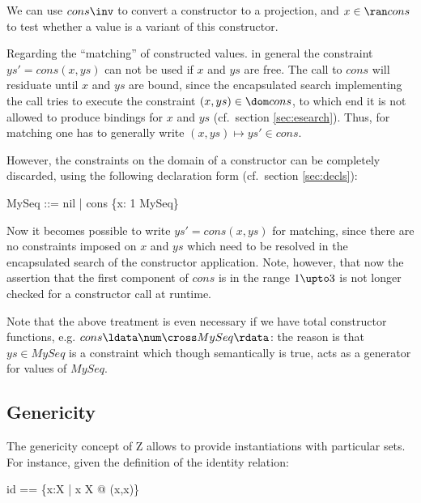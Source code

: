 \documentclass{article}
\begin{document}
We can use $cons\inv$ to convert a constructor to a projection,
and $x \in \ran cons$ to test whether a value is a variant of
this constructor.

Regarding the ``matching'' of constructed values.  in general the
constraint $ys' = cons(x,ys)$ can not be used if $x$ and $ys$ are
free.  The call to $cons$ will residuate until $x$ and $ys$ are bound,
since the encapsulated search implementing the call tries to execute
the constraint $(x,ys) \in \dom cons$, to which end it is not allowed
to produce bindings for $x$ and $ys$ (cf.~section \ref{sec:esearch}).
Thus, for matching one has to generally write $(x,ys) \mapsto ys' \in
cons$.

However, the constraints on the domain of a constructor can be
completely discarded, using the following declaration form
(cf.~section \ref{sec:decls}):

\begin{zedgroup}
\begin{zdirectives}
\end{zdirectives}
\begin{zed}
  MySeq ::= nil | cons \ldata \{x: 1  \cross MySeq\} \rdata
\end{zed}
\end{zedgroup}

Now it becomes possible to write $ys' = cons(x,ys)$ for matching,
since there are no constraints imposed on $x$ and $ys$ which need
to be resolved in the encapsulated search of the constructor
application. Note, however, that now the assertion that
the first component of $cons$ is in the range $1 \upto 3$ is
not longer checked for a constructor call at runtime. 

Note that the above treatment is even necessary if we have total
constructor functions, e.g. $cons \ldata \num \cross MySeq \rdata$:
the reason is that $ys \in MySeq$ is a constraint which though
semantically is true, acts as a generator for values of $MySeq$.


\subsection{Genericity}

The genericity concept of Z allows to provide instantiations
with particular sets. For instance, given the definition
of the identity relation:

\begin{zedgroup}
\begin{zdirectives}
\end{zdirectives}
\begin{axdef}[X]
  id == \{x:X | x \in X @ (x,x)\}
\end{axdef}
\end{zedgroup}
\end{document}
